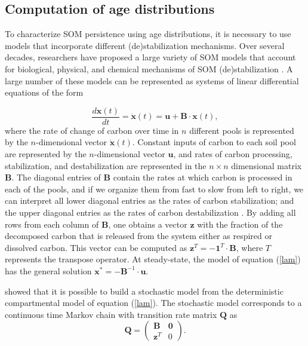 \documentclass[draft,linenumbers]{agujournal}
\begin{document}
\subsection{Computation of age distributions}
To characterize SOM persistence using age distributions, it is necessary to use models that incorporate different (de)stabilization mechanisms. Over several decades, researchers have proposed a large variety of SOM models that account for biological, physical, and chemical mechanisms of SOM (de)stabilization \citep{Manzoni2009SBB}. A large number of these models can be represented as systems of linear differential equations \citep{Sierra2015EM} of the form

\begin{equation} \label{lam}
\frac{d \bm{x}(t)}{dt} = \dot{\bm{x}}(t) = \bm{u} + \mathbf{B} \cdot \bm{x}(t),
\end{equation}
where the rate of change of carbon over time in $n$ different pools is represented by the $n$-dimensional vector $\dot{\bm{x}}(t)$. Constant inputs of carbon to each soil pool are represented by the $n$-dimensional vector $\bm{u}$, and rates of carbon processing, stabilization, and destabilization are represented in the $n \times n$ dimensional matrix $\mathbf{B}$. The diagonal entries of $\mathbf{B}$ contain the rates at which carbon is processed in each of the pools, and if we organize them from fast to slow from left to right, we can interpret all lower diagonal entries as the rates of carbon stabilization; and the upper diagonal entries as the rates of carbon destabilization \citep{Sierra2015EM, Sierra2011EM}. By adding all rows from each column of $\mathbf{B}$, one obtains a vector $\bm{z}$ with the fraction of the decomposed carbon that is released from the system either as respired or dissolved carbon. This vector can be computed as $\bm{z}^T = - \mathbf{1}^{T} \cdot \mathbf{B}$, where $T$ represents the transpose operator.  At steady-state, the model of equation (\ref{lam}) has the general solution ${\bm x}^{\ast} = - \mathbf{B}^{-1} \cdot {\bm u}$.

\citet{Metzler2018MG} showed that it is possible to build a stochastic model from the deterministic compartmental model of equation (\ref{lam}). The stochastic model corresponds to a continuous time Markov chain with transition rate matrix $\mathbf{Q}$ as
\begin{equation} \label{Q}
\mathbf{Q}=\begin{pmatrix} \mathbf{B} & \mathbf{0} \\ \bm{z}^T  & 0 \end{pmatrix}.
\end{equation}
\end{document}
